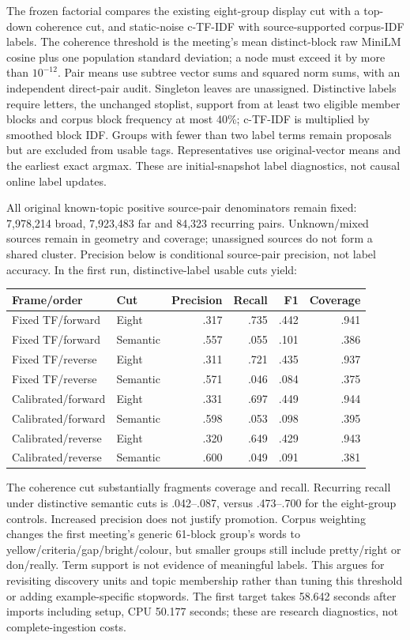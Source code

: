 \documentclass[11pt]{article}
\begin{document}
The frozen factorial compares the existing eight-group display cut with a
top-down coherence cut, and static-noise c-TF-IDF with source-supported
corpus-IDF labels. The coherence threshold is the meeting's mean distinct-block
raw MiniLM cosine plus one population standard deviation; a node must exceed
it by more than $10^{-12}$. Pair means use subtree vector sums and squared
norm sums, with an independent direct-pair audit. Singleton leaves are
unassigned. Distinctive labels require letters, the unchanged stoplist,
support from at least two eligible member blocks and corpus block frequency
at most 40\%; c-TF-IDF is multiplied by smoothed block IDF. Groups with fewer
than two label terms remain proposals but are excluded from usable tags.
Representatives use original-vector means and the earliest exact argmax.
These are initial-snapshot label diagnostics, not causal online label updates.

All original known-topic positive source-pair denominators remain fixed:
7,978,214 broad, 7,923,483 far and 84,323 recurring pairs. Unknown/mixed sources
remain in geometry and coverage; unassigned sources do not form a shared
cluster. Precision below is conditional source-pair precision, not label
accuracy. In the first run, distinctive-label usable cuts yield:
\begin{center}
\begin{tabular}{llrrrr}
Frame/order & Cut & Precision & Recall & F1 & Coverage\\
\hline
Fixed TF/forward & Eight & .317 & .735 & .442 & .941\\
Fixed TF/forward & Semantic & .557 & .055 & .101 & .386\\
Fixed TF/reverse & Eight & .311 & .721 & .435 & .937\\
Fixed TF/reverse & Semantic & .571 & .046 & .084 & .375\\
Calibrated/forward & Eight & .331 & .697 & .449 & .944\\
Calibrated/forward & Semantic & .598 & .053 & .098 & .395\\
Calibrated/reverse & Eight & .320 & .649 & .429 & .943\\
Calibrated/reverse & Semantic & .600 & .049 & .091 & .381\\
\end{tabular}
\end{center}
The coherence cut substantially fragments coverage and recall. Recurring
recall under distinctive semantic cuts is .042--.087, versus .473--.700 for
the eight-group controls. Increased precision does not justify promotion.
Corpus weighting changes the first meeting's generic 61-block group's words
to yellow/criteria/gap/bright/colour, but smaller groups still include
pretty/right or don/really. Term support is not evidence of meaningful labels.
This argues for revisiting discovery units and topic membership rather than
tuning this threshold or adding example-specific stopwords. The first target
takes 58.642 seconds after imports including setup, CPU 50.177 seconds;
these are research diagnostics, not complete-ingestion costs.
\end{document}
